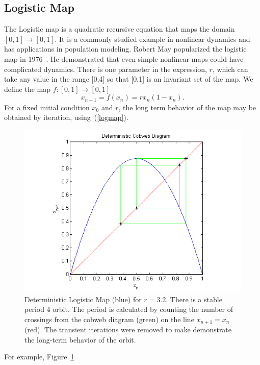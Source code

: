 \subsection{Logistic Map}
The Logistic map is a quadratic recursive equation that maps the domain
$[0,1] \rightarrow [0,1]$. It is a commonly studied example in nonlinear dynamics and has
applications in population modeling. Robert May popularized the
logistic map in 1976~\cite{may}. He demonstrated that even simple nonlinear
maps could have complicated dynamics. There is one parameter in the
expression, $r$, which can take any value in the range [0,4] so that
[0,1] is an invariant set of the map. We define the map $f:[0,1]\to [0,1]$
\begin{equation}\label{logmap}
x_{n+1} = f(x_n) = rx_n(1-x_n).
\end{equation}
For a fixed initial condition $x_0$ and $r$, the long term behavior of
the map may be obtained by iteration, using~(\ref{logmap}). 
\begin{figure}[!h]
\caption[Deterministic logistic map, stable orbit]{Deterministic
  Logistic Map (blue) for $r=3.2$. There is a stable period 4
  orbit. The period is calculated by counting the number of crossings
  from the cobweb diagram (green) on the line $x_{n+1}=x_n$ (red). The
  transient iterations were removed to make demonstrate the long-term
  behavior of the orbit.}\label{fig:detlogstable}
    \begin{center}
	\includegraphics[scale=0.75]{figs/det_cobweb.png}
    \end{center}
\end{figure}
For example, Figure~\ref{fig:detlogstable}
